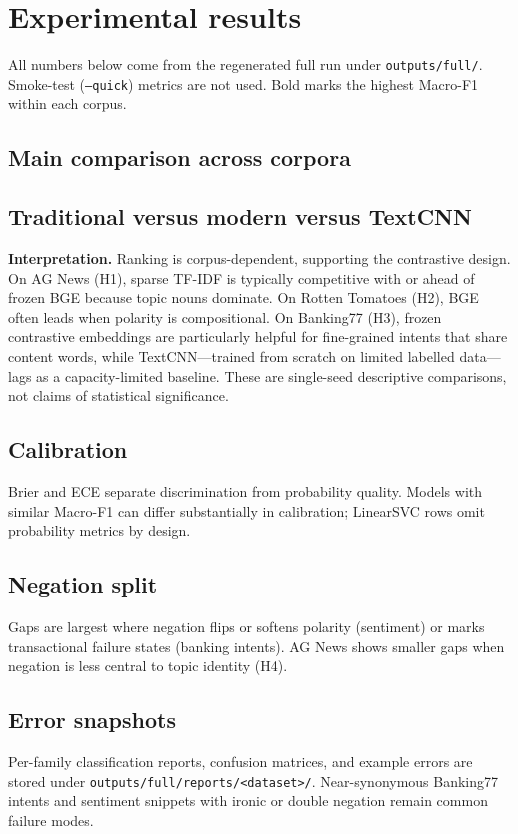 \section{Experimental results}

All numbers below come from the regenerated full run under \texttt{outputs/full/}. Smoke-test (\texttt{--quick}) metrics are not used. Bold marks the highest Macro-F1 within each corpus.

\subsection{Main comparison across corpora}



\subsection{Traditional versus modern versus TextCNN}



\textbf{Interpretation.} Ranking is corpus-dependent, supporting the contrastive design. On AG News (H1), sparse TF-IDF is typically competitive with or ahead of frozen BGE because topic nouns dominate. On Rotten Tomatoes (H2), BGE often leads when polarity is compositional. On Banking77 (H3), frozen contrastive embeddings are particularly helpful for fine-grained intents that share content words, while TextCNN---trained from scratch on limited labelled data---lags as a capacity-limited baseline. These are single-seed descriptive comparisons, not claims of statistical significance.

\subsection{Calibration}



Brier and ECE separate discrimination from probability quality. Models with similar Macro-F1 can differ substantially in calibration; LinearSVC rows omit probability metrics by design.

\subsection{Negation split}



Gaps are largest where negation flips or softens polarity (sentiment) or marks transactional failure states (banking intents). AG News shows smaller gaps when negation is less central to topic identity (H4).

\subsection{Error snapshots}

Per-family classification reports, confusion matrices, and example errors are stored under \texttt{outputs/full/reports/<dataset>/}. Near-synonymous Banking77 intents and sentiment snippets with ironic or double negation remain common failure modes.
